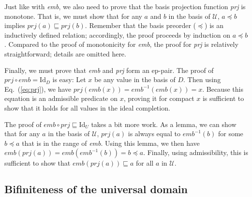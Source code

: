 Just like with \emph{emb}, we also need to prove that the basis projection function \emph{prj} is monotone. That is, we must show that for any $a$ and $b$ in the basis of $\mathcal{U}$, $a \preceq b$ implies $\mathit{prj}(a) \sqsubseteq \mathit{prj}(b)$. Remember that the basis preorder ($\preceq$) is an inductively defined relation; accordingly, the proof proceeds by induction on $a \preceq b$. Compared to the proof of monotonicity for \emph{emb}, the proof for \emph{prj} is relatively straightforward; details are omitted here.

Finally, we must prove that \emph{emb} and \emph{prj} form an ep-pair. The proof of $\mathit{prj} \circ \mathit{emb} = \mathrm{Id}_D$ is easy: Let $x$ be any value in the basis of $D$. Then using Eq.~(\ref{eq:prj}), we have $\mathit{prj}(\mathit{emb}(x)) = \mathit{emb}^{-1}(\mathit{emb}(x)) = x$. Because this equation is an admissible predicate on $x$, proving it for compact $x$ is sufficient to show that it holds for all values in the ideal completion.

The proof of $\mathit{emb} \circ \mathit{prj} \sqsubseteq \mathrm{Id}_U$ takes a bit more work. As a lemma, we can show that for any $a$ in the basis of $\mathcal{U}$, $\mathit{prj}(a)$ is always equal to $\mathit{emb}^{-1}(b)$ for some $b \preceq a$ that is in the range of \emph{emb}. Using this lemma, we then have $\mathit{emb}(\mathit{prj}(a)) = \mathit{emb}(\mathit{emb}^{-1}(b)) = b \preceq a$. Finally, using admissibility, this is sufficient to show that $\mathit{emb}(\mathit{prj}(a)) \sqsubseteq a$ for all $a$ in $\mathcal{U}$.

\subsection{Bifiniteness of the universal domain}

